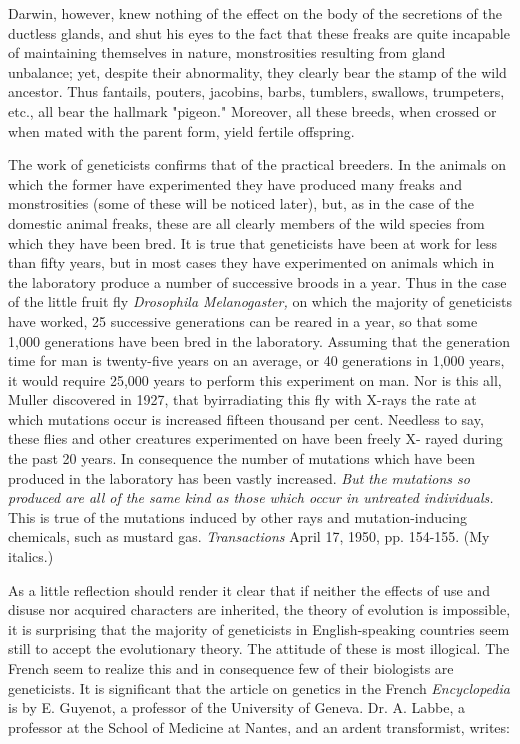 Darwin, however, knew nothing of the effect on the body of the secretions of the ductless
glands, and shut his eyes to the fact that these freaks are quite incapable of maintaining
themselves in nature, monstrosities resulting from gland unbalance; yet, despite their
abnormality, they clearly bear the stamp of the wild ancestor. Thus fantails, pouters, jacobins,
barbs, tumblers, swallows, trumpeters, etc., all bear the hallmark "pigeon." Moreover, all
these breeds, when crossed or when mated with the parent form, yield fertile offspring.

The work of geneticists confirms that of the practical breeders. In the animals on which the
former have experimented they have produced many freaks and monstrosities (some of these
will be noticed later), but, as in the case of the domestic animal freaks, these are all clearly
members of the wild species from which they have been bred. It is true that geneticists have
been at work for less than fifty years, but in most cases they have experimented on animals
which in the laboratory produce a number of successive broods in a year. Thus in the case of
the little fruit fly \textit{Drosophila Melanogaster,} on which the majority of geneticists have
worked, 25 successive generations can be reared in a year, so that some 1,000 generations
have been bred in the laboratory. Assuming that the generation time for man is twenty-five
years on an average, or 40 generations in 1,000 years, it would require 25,000 years to
perform this experiment on man. Nor is this all, Muller discovered in 1927, that byirradiating this fly with X-rays the rate at which mutations occur is increased fifteen thousand
per cent. Needless to say, these flies and other creatures experimented on have been freely X-
rayed during the past 20 years. In consequence the number of mutations which have been
produced in the laboratory has been vastly increased. \textit{But the mutations so produced are all
of the same kind as those which occur in untreated individuals.} This is true of the mutations
induced by other rays and mutation-inducing chemicals, such as mustard gas. \textit{Transactions}
April 17, 1950, pp. 154-155. (My italics.)

As a little reflection should render it clear that if neither the effects of use and disuse nor
acquired characters are inherited, the theory of evolution is impossible, it is surprising that
the majority of geneticists in English-speaking countries seem still to accept the evolutionary
theory. The attitude of these is most illogical. The French seem to realize this and in
consequence few of their biologists are geneticists. It is significant that the article on genetics
in the French \textit{Encyclopedia} is by E. Guyenot, a professor of the University of Geneva. Dr. A.
Labbe, a professor at the School of Medicine at Nantes, and an ardent transformist, writes:


